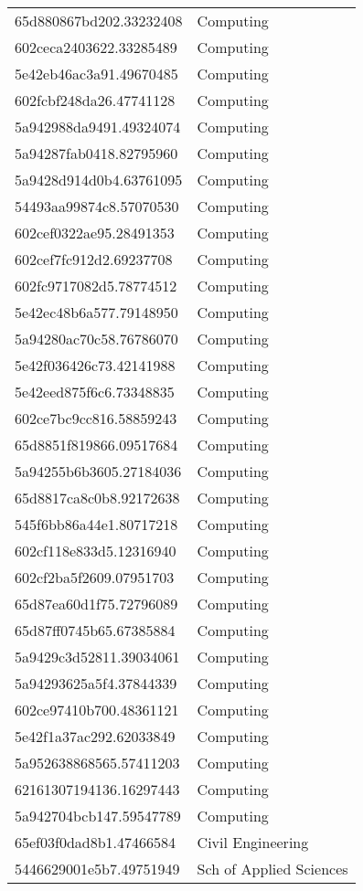 \begin{tabular}{ll}
65d880867bd202.33232408 & Computing \\
602ceca2403622.33285489 & Computing \\
5e42eb46ac3a91.49670485 & Computing \\
602fcbf248da26.47741128 & Computing \\
5a942988da9491.49324074 & Computing \\
5a94287fab0418.82795960 & Computing \\
5a9428d914d0b4.63761095 & Computing \\
54493aa99874c8.57070530 & Computing \\
602cef0322ae95.28491353 & Computing \\
602cef7fc912d2.69237708 & Computing \\
602fc9717082d5.78774512 & Computing \\
5e42ec48b6a577.79148950 & Computing \\
5a94280ac70c58.76786070 & Computing \\
5e42f036426c73.42141988 & Computing \\
5e42eed875f6c6.73348835 & Computing \\
602ce7bc9cc816.58859243 & Computing \\
65d8851f819866.09517684 & Computing \\
5a94255b6b3605.27184036 & Computing \\
65d8817ca8c0b8.92172638 & Computing \\
545f6bb86a44e1.80717218 & Computing \\
602cf118e833d5.12316940 & Computing \\
602cf2ba5f2609.07951703 & Computing \\
65d87ea60d1f75.72796089 & Computing \\
65d87ff0745b65.67385884 & Computing \\
5a9429c3d52811.39034061 & Computing \\
5a94293625a5f4.37844339 & Computing \\
602ce97410b700.48361121 & Computing \\
5e42f1a37ac292.62033849 & Computing \\
5a952638868565.57411203 & Computing \\
62161307194136.16297443 & Computing \\
5a942704bcb147.59547789 & Computing \\
65ef03f0dad8b1.47466584 & Civil Engineering \\
5446629001e5b7.49751949 & Sch of Applied Sciences \\

\end{tabular}
